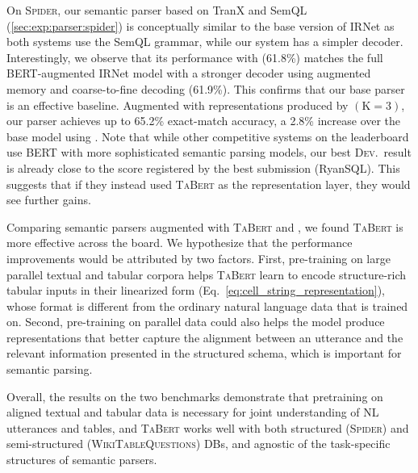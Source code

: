 \documentclass[11pt,a4paper]{article}
\def\model/{\textsc{TaBert}}
\def\modellarge/{}
\def\bert/{}
\def\bertbase/{}
\newcommand{\CS}[1]{\ensuremath{\mathrm{(K=#1)}}}
\def\wtq/{\textsc{WikiTableQuestions}}
\def\spider/{\textsc{Spider}}
\begin{document}
On \spider/, our semantic parser based on TranX and SemQL (\autoref{sec:exp:parser:spider}) is conceptually similar to the base version of IRNet as both systems use the SemQL grammar, while our system has a simpler decoder.
Interestingly, we observe that its performance with \bertbase/ (61.8\%) matches the full BERT-augmented IRNet model with a stronger decoder using augmented memory and coarse-to-fine decoding (61.9\%).
This confirms that our base parser is an effective baseline.
Augmented with representations produced by \modellarge/\CS{3}, our parser achieves up to 65.2\% exact-match accuracy, a 2.8\% increase over the base model using \bertbase/.
Note that while other competitive systems on the leaderboard use BERT with more sophisticated semantic parsing models, our best \textsc{Dev.}~result is already close to the score registered by the best submission (RyanSQL\bert/).
This suggests that if they instead used \model/ as the representation layer, they would see further gains.


Comparing semantic parsers augmented with \model/ and \bert/, we found \model/ is more effective across the board.
We hypothesize that the performance improvements would be attributed by two factors. 
First, pre-training on large parallel textual and tabular corpora helps \model/ learn to encode structure-rich tabular inputs in their linearized form (Eq.~\eqref{eq:cell_string_representation}), whose format is different from the ordinary natural language data that \bert/ is trained on.
Second, pre-training on parallel data could also helps the model produce representations that better capture the alignment between an utterance 
and the relevant information presented in the structured schema,
which is important for semantic parsing.

Overall, the results on the two benchmarks demonstrate that pretraining on aligned textual and tabular data is necessary for joint understanding of NL utterances and tables,
and \model/ works well with both structured (\spider/) and semi-structured (\wtq/) DBs, and agnostic of the task-specific structures of semantic parsers.
\end{document}
